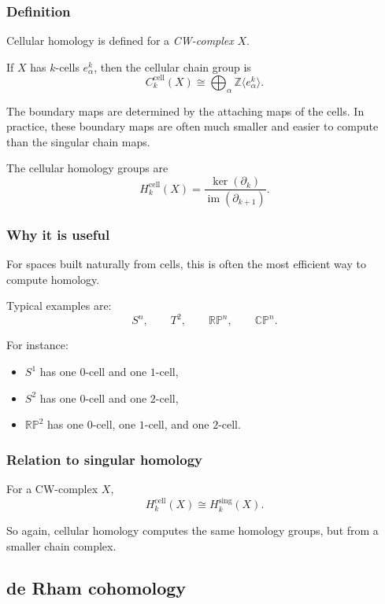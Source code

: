 \documentclass[12pt,a4paper]{article}
\theoremstyle{notespace}
\begin{document}
\subsubsection{Definition}

Cellular homology is defined for a \emph{CW-complex} \(X\).

If \(X\) has \(k\)-cells \(e^k_\alpha\), then the cellular chain group is
\[
C_k^{\mathrm{cell}}(X)\cong \bigoplus_\alpha \mathbb Z\langle e^k_\alpha\rangle.
\]

The boundary maps are determined by the attaching maps of the cells. In practice, these boundary maps are often much smaller and easier to compute than the singular chain maps.

The cellular homology groups are
\[
H_k^{\mathrm{cell}}(X)=\frac{\ker(\partial_k)}{\operatorname{im}(\partial_{k+1})}.
\]

\subsubsection{Why it is useful}

For spaces built naturally from cells, this is often the most efficient way to compute homology.

Typical examples are:
\[
S^n,\qquad T^2,\qquad \mathbb{RP}^n,\qquad \mathbb{CP}^n.
\]

For instance:

\begin{itemize}
	\item \(S^1\) has one \(0\)-cell and one \(1\)-cell,
	\item \(S^2\) has one \(0\)-cell and one \(2\)-cell,
	\item \(\mathbb{RP}^2\) has one \(0\)-cell, one \(1\)-cell, and one \(2\)-cell.
\end{itemize}

\subsubsection{Relation to singular homology}

For a CW-complex \(X\),
\[
H_k^{\mathrm{cell}}(X)\cong H_k^{\mathrm{sing}}(X).
\]

So again, cellular homology computes the same homology groups, but from a smaller chain complex.

\subsection{ de Rham cohomology}
\end{document}
